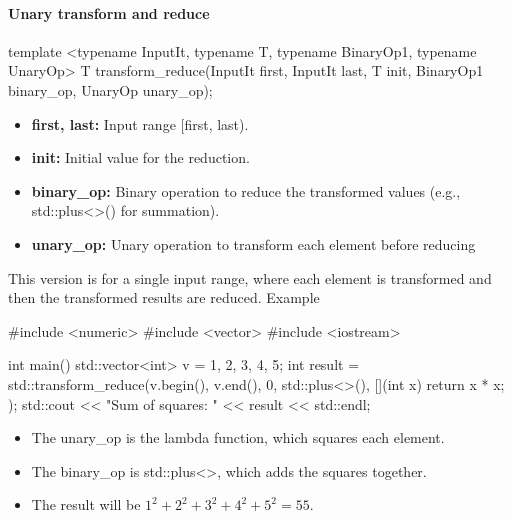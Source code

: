\documentclass{report}
\begin{document}
   \paragraph{Unary transform and reduce}
   \bigbreak \noindent \bigbreak \noindent 
   \begin{cppcode}
    template <typename InputIt, typename T, typename BinaryOp1, typename UnaryOp>
    T transform_reduce(InputIt first, InputIt last, T init, BinaryOp1 binary_op, UnaryOp unary_op);
   \end{cppcode}
   \bigbreak \noindent 
   \begin{itemize}
       \item \textbf{first, last:} Input range [first, last).
       \item \textbf{init:} Initial value for the reduction.
       \item \textbf{binary\_op:} Binary operation to reduce the transformed values (e.g., std::plus<>() for summation).
       \item \textbf{unary\_op:} Unary operation to transform each element before reducing
   \end{itemize}
   \bigbreak \noindent 
   This version is for a single input range, where each element is transformed and then the transformed results are reduced.
   \bigbreak \noindent 
   Example
   \bigbreak \noindent 
   \begin{cppcode}
       #include <numeric>
       #include <vector>
       #include <iostream>

       int main() {
           std::vector<int> v = {1, 2, 3, 4, 5};
           int result = std::transform_reduce(v.begin(), v.end(), 0, std::plus<>(), [](int x) { return x * x; });
           std::cout << "Sum of squares: " << result << std::endl;
       }

   \end{cppcode}
   \begin{itemize}
       \item The unary\_op is the lambda function, which squares each element.
       \item The binary\_op is std::plus<>, which adds the squares together.
       \item The result will be $1^{2} + 2^{2} + 3^{2} + 4^{2} + 5^{2} = 55$.
   \end{itemize}

   \bigbreak \noindent 
\end{document}
